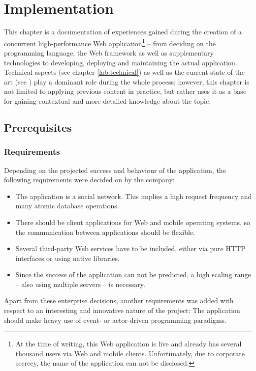 \chapter{Implementation}
\label{sec:impl}
This chapter is a documentation of experiences gained during the creation of a concurrent high-performance Web application\footnote{At the time of writing, this Web application is live and already has several thousand users via Web and mobile clients. Unfortunately, due to corporate secrecy, the name of the application can not be disclosed.} -- from deciding on the programming language, the Web framework as well as supplementary technologies to developing, deploying and maintaining the actual application. Technical aspects (see chapter \ref{lab:technical}) as well as the current state of the art (see ) play a dominant role during the whole process; however, this chapter is not limited to applying previous content in practice, but rather uses it as a base for gaining contextual and more detailed knowledge about the topic.

\section{Prerequisites}

\subsection{Requirements}
Depending on the projected success and behaviour of the application, the following requirements were decided on by the company:

\begin{itemize}
  \item{The application is a social network. This implies a high request frequency and many atomic database operations.}
  \item{There should be client applications for Web and mobile operating systems, so the communication between applications should be flexible.}
  \item{Several third-party Web services have to be included, either via pure HTTP interfaces or using native libraries.}
  \item{Since the success of the application can not be predicted, a high scaling range -- also using multiple servers -- is necessary.}
\end{itemize}

Apart from these enterprise decisions, another requirements was added with respect to an interesting and innovative nature of the project: The application should make heavy use of event- or actor-driven programming paradigms.

